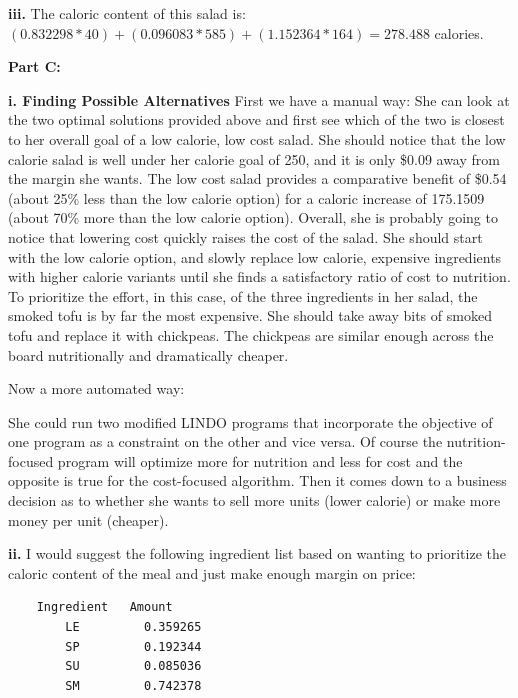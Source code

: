\documentclass[paper=a4, fontsize=11pt]{scrartcl} %
\numberwithin{equation}{section} %
\numberwithin{figure}{section} %
\numberwithin{table}{section} %
\begin{document}
    \textbf{iii.}\newline
    The caloric content of this salad is: $(0.832298 * 40) + (0.096083 * 585)  + (1.152364 * 164) = 278.488$ calories.
    
\textbf{Part C:}
	
    \textbf{i. Finding Possible Alternatives}\newline
    First we have a manual way:\newline
    She can look at the two optimal solutions provided above and first see which of the two is closest to her overall goal of a low calorie, low cost salad. She should notice that the low calorie salad is well under her calorie goal of 250, and it is only \$0.09 away from the margin she wants. The low cost salad provides a comparative benefit of \$0.54 (about 25\% less than the low calorie option) for a caloric increase of 175.1509 (about 70\% more than the low calorie option).\newline
    Overall, she is probably going to notice that lowering cost quickly raises the cost of the salad. She should start with the low calorie option, and slowly replace low calorie, expensive ingredients with higher calorie variants until she finds a satisfactory ratio of cost to nutrition. To prioritize the effort, in this case, of the three ingredients in her salad, the smoked tofu is by far the most expensive. She should take away bits of smoked tofu and replace it with chickpeas. The chickpeas are similar enough across the board nutritionally and dramatically cheaper.\newline
    
    Now a more automated way:\newline
    
    She could run two modified LINDO programs that incorporate the objective of one program as a constraint on the other and vice versa. Of course the nutrition-focused program will optimize more for nutrition and less for cost and the opposite is true for the cost-focused algorithm. Then it comes down to a business decision as to whether she wants to sell more units (lower calorie) or make more money per unit (cheaper).\newline
    
    \textbf{ii.}\newline
	I would suggest the following ingredient list based on wanting to prioritize the caloric content of the meal and just make enough margin on price:
    \begin{verbatim}
    Ingredient   Amount
        LE         0.359265
        SP         0.192344
        SU         0.085036
        SM         0.742378
    \end{verbatim}
    
\end{document}
